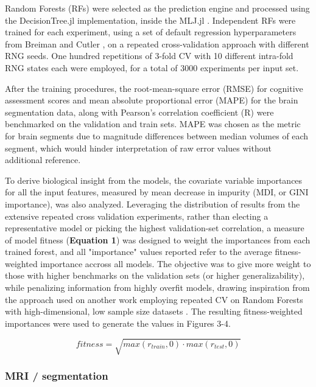 \documentclass{article}
\providecommand{\DIFadd}[1]{{\protect\color{blue}\uwave{#1}}} %
\providecommand{\DIFaddbegin}{} %
\providecommand{\DIFaddend}{} %
\newcommand{\DIFaddincludegraphics}[2][]{{\color{blue}\fbox{\DIFOincludegraphics[#1]{#2}}}} %
\DeclareRobustCommand{\DIFaddbegin}{\DIFOaddbegin \let\includegraphics\DIFaddincludegraphics} %
\DeclareRobustCommand{\DIFaddend}{\DIFOaddend \let\includegraphics\DIFOincludegraphics} %
\begin{document}
Random Forests (RFs)
\cite{breimanRandomForests2001}
were selected as the prediction engine and processed using the
DecisionTree.jl \cite{sadeghiDecisionTreeJlJulia2022}
implementation, inside the MLJ.jl \cite{blaomMLJJuliaPackage2020}.
Independent RFs were trained for each
experiment, using a set of default regression hyperparameters from
Breiman and Cutler \cite{breimanRandomForests2001},
on a repeated cross-validation approach with different RNG seeds. One hundred
repetitions of 3-fold CV with 10 different intra-fold RNG states each
were employed, for a total of 3000 experiments per input set.

After the training procedures, the root-mean-square error (RMSE) for
cognitive assessment scores and mean absolute proportional error (MAPE)
for the brain segmentation data, along with Pearson's
correlation coefficient (R) were benchmarked on the validation and train
sets. MAPE was chosen as the metric for brain segments due to magnitude
differences between median volumes of each segment, which would hinder
interpretation of raw error values without additional reference.

To derive biological insight from the models, the covariate variable
importances for all the input features, measured by mean decrease in
impurity (MDI, or GINI importance), was also analyzed. Leveraging the
distribution of results from the extensive repeated cross validation
experiments, rather than electing a representative model or picking the
highest validation-set correlation, a measure of model fitness
(\textbf{Equation 1}) was designed to weight the importances from each
trained forest, and all "importance" values reported refer to 
the average fitness-weighted importance accross all models.
The objective was to give more weight to those with
higher benchmarks on the validation sets (or higher generalizability),
while penalizing information from highly overfit models, drawing
inspiration from the approach used on another work employing repeated CV
on Random Forests with high-dimensional, low sample size
datasets  \DIFaddbegin \DIFadd{\mbox{%
\cite{woodruffChronicInflammationNeutrophil2023a}}\hskip0pt%
}\DIFaddend .
The resulting fitness-weighted importances were used
to generate the values in Figures 3-4.

\begin{equation}
    fitness = \sqrt{max(r_{train}, 0) \cdot max(r_{test}, 0)}
\end{equation}


\subsubsection*{MRI / segmentation}
\end{document}
